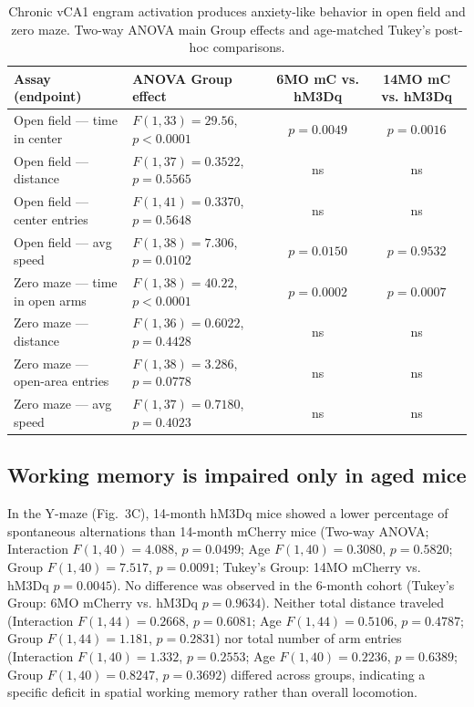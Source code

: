 \documentclass[11pt]{article}
\begin{document}
\begin{table}[h]
\centering
\caption{Chronic vCA1 engram activation produces anxiety-like behavior in open field and zero maze. Two-way ANOVA main Group effects and age-matched Tukey's post-hoc comparisons.}
\label{tab:anxiety}
\begin{tabular}{llcc}
\toprule
Assay (endpoint) & ANOVA Group effect & 6MO mC vs. hM3Dq & 14MO mC vs. hM3Dq \\
\midrule
Open field --- time in center   & $F(1,33)=29.56$, $p<0.0001$ & $p=0.0049$ & $p=0.0016$ \\
Open field --- distance         & $F(1,37)=0.3522$, $p=0.5565$ & ns & ns \\
Open field --- center entries   & $F(1,41)=0.3370$, $p=0.5648$ & ns & ns \\
Open field --- avg speed        & $F(1,38)=7.306$, $p=0.0102$  & $p=0.0150$ & $p=0.9532$ \\
Zero maze --- time in open arms & $F(1,38)=40.22$, $p<0.0001$ & $p=0.0002$ & $p=0.0007$ \\
Zero maze --- distance          & $F(1,36)=0.6022$, $p=0.4428$ & ns & ns \\
Zero maze --- open-area entries & $F(1,38)=3.286$, $p=0.0778$  & ns & ns \\
Zero maze --- avg speed         & $F(1,37)=0.7180$, $p=0.4023$ & ns & ns \\
\bottomrule
\end{tabular}
\end{table}

\subsection{Working memory is impaired only in aged mice}
In the Y-maze (Fig.~3C), 14-month hM3Dq mice showed a lower percentage of spontaneous alternations than 14-month mCherry mice (Two-way ANOVA; Interaction $F(1,40)=4.088$, $p=0.0499$; Age $F(1,40)=0.3080$, $p=0.5820$; Group $F(1,40)=7.517$, $p=0.0091$; Tukey's Group: 14MO mCherry vs. hM3Dq $p=0.0045$). No difference was observed in the 6-month cohort (Tukey's Group: 6MO mCherry vs. hM3Dq $p=0.9634$). Neither total distance traveled (Interaction $F(1,44)=0.2668$, $p=0.6081$; Age $F(1,44)=0.5106$, $p=0.4787$; Group $F(1,44)=1.181$, $p=0.2831$) nor total number of arm entries (Interaction $F(1,40)=1.332$, $p=0.2553$; Age $F(1,40)=0.2236$, $p=0.6389$; Group $F(1,40)=0.8247$, $p=0.3692$) differed across groups, indicating a specific deficit in spatial working memory rather than overall locomotion.
\end{document}
